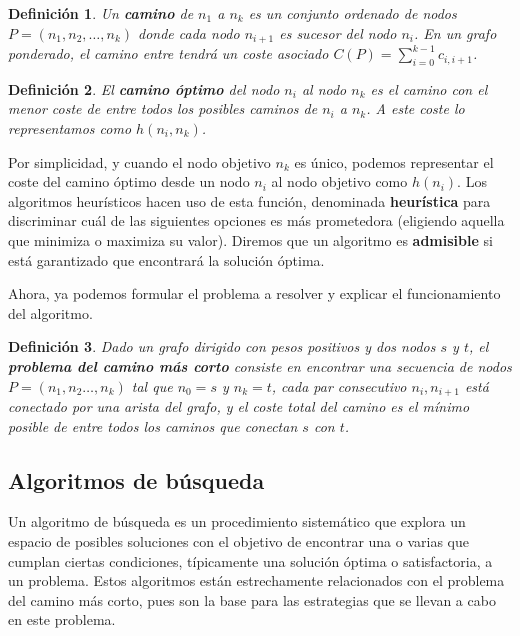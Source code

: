 \documentclass[a4paper,12pt]{article}
\newtheorem{defn}{Definición}
\begin{document}
\begin{defn}
Un \textbf{camino} de $n_1$ a $n_k$ es un conjunto ordenado de nodos $P = (n_1,n_2, \allowbreak \dots ,n_k)$ donde cada nodo $n_{i+1}$ es sucesor del nodo $n_i$. En un grafo ponderado, el camino entre tendrá un coste asociado $C(P) = \sum_{i=0}^{k-1}c_{i,i+1}$.
\end{defn}

\noindent 

\begin{defn}
El \textbf{camino óptimo} del nodo $n_i$ al nodo $n_k$ es el camino con el menor coste de entre todos los posibles caminos de $n_i$ a $n_k$. A este coste lo representamos como $h(n_i, n_k)$.
\end{defn}

\noindent Por simplicidad, y cuando el nodo objetivo $n_k$ es único, podemos representar el coste del camino óptimo desde un nodo $n_i$ al nodo objetivo como $h(n_i)$. Los algoritmos heurísticos hacen uso de esta función, denominada \textbf{heurística} para discriminar cuál de las siguientes opciones es más prometedora (eligiendo aquella que minimiza o maximiza su valor). Diremos que un algoritmo es \textbf{admisible} si está garantizado que encontrará la solución óptima.

Ahora, ya podemos formular el problema a resolver y explicar el funcionamiento del algoritmo.

\begin{defn}\label{def:shortest_path_problem}
Dado un grafo dirigido con pesos positivos y dos nodos $s$ y $t$, el \textbf{problema del camino más corto} consiste en encontrar una secuencia de nodos $P = (n_1, n_2 \dots, n_k)$ tal que $n_0 = s$ y $n_k = t$, cada par consecutivo $n_i, n_{i+1}$ está conectado por una arista del grafo, y el coste total del camino es el mínimo posible de entre todos los caminos que conectan $s$ con $t$.
\end{defn}



\subsection{Algoritmos de búsqueda}\label{sec:alg-busqueda}

Un algoritmo de búsqueda es un procedimiento sistemático que explora un espacio de posibles soluciones con el objetivo de encontrar una o varias que cumplan ciertas condiciones, típicamente una solución óptima o satisfactoria, a un problema. Estos algoritmos están estrechamente relacionados con el problema del camino más corto, pues son la base para las estrategias que se llevan a cabo en este problema. 
\end{document}
